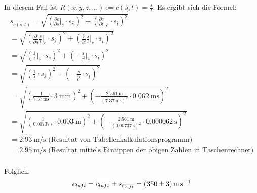 In diesem Fall ist $R(x,y,z,...) := c(s,t) = \frac{s}{t}$. Es ergibt sich die Formel:
\begin{gather*}
    s_{\overline{c(s,t)}} = \sqrt{ \left( \frac{\partial c}{\partial s} \biggr\rvert_{\overline{c}} \cdot s_{\overline{s}}\right)^2
                            + \left( \frac{\partial c}{\partial t} \biggr\rvert_{\overline{c}} \cdot s_{\overline{t}}\right)^2 } \\
                            = \sqrt{ \left( \frac{\partial}{\partial s}\frac{s}{t} \biggr\rvert_{\overline{c}} \cdot s_{\overline{s}}\right)^2
                            + \left( \frac{\partial}{\partial t}\frac{s}{t} \biggr\rvert_{\overline{c}} \cdot s_{\overline{t}}\right)^2 } \\
                            = \sqrt{ \left( \frac{1}{t} \biggr\rvert_{\overline{c}} \cdot s_{\overline{s}}\right)^2
                            + \left( - \frac{s}{t^2} \biggr\rvert_{\overline{c}} \cdot s_{\overline{t}}\right)^2 } \\
                            = \sqrt{ \left( \frac{1}{\overline{t}} \cdot s_{\overline{s}}\right)^2
                            + \left( - \frac{\overline{s}}{\overline{t}^2} \cdot s_{\overline{t}}\right)^2 } \\
                            = \sqrt{ \left( \frac{1}{\SI{7.37}{\milli\second}} \cdot \SI{3}{\milli\meter} \right)^2
                            + \left( - \frac{\SI{2.561}{\meter}}{(\SI{7.37}{\milli\second})^2} \cdot \SI{0.062}{\milli\second}\right)^2 } \\
                            = \sqrt{ \left( \frac{1}{\SI{0.00737}{\second}} \cdot \SI{0.003}{\meter} \right)^2
                            + \left( - \frac{\SI{2.561}{\meter}}{(\SI{0.00737}{\second})^2} \cdot \SI{0.000062}{\second}\right)^2 } \\
                            = \SI{2.93}{\meter\per\second} \text{ (Resultat von Tabellenkalkulationsprogramm)} \\
                            = \SI{2.95}{\meter\per\second} \text{ (Resultat mittels Eintippen der obigen Zahlen in Taschenrechner)} \\
\end{gather*}

Folglich:
\begin{equation}
    c_{luft} = \overline{c_{luft}} \pm s_{\overline{c_{luft}}} = \SI[separate-uncertainty = true]{350 \pm 3}{\meter\per\second}
\end{equation}

\clearpage
